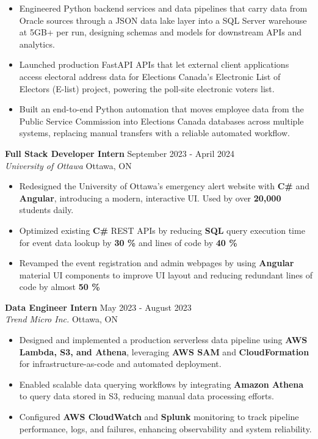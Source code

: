 \documentclass[a4paper]{article}
\begin{document}
\begin{itemize}
\item Engineered Python backend services and data pipelines that carry data from Oracle sources through a JSON data lake layer into a SQL Server warehouse at 5GB+ per run, designing schemas and models for downstream APIs and analytics.

\item Launched production FastAPI APIs that let external client applications access electoral address data for Elections Canada's Electronic List of Electors (E-list) project, powering the poll-site electronic voters list.

\item Built an end-to-end Python automation that moves employee data from the Public Service Commission into Elections Canada databases across multiple systems, replacing manual transfers with a reliable automated workflow.

\end{itemize}

\textbf{Full Stack Developer Intern } \hfill September 2023 - April 2024\\
\textit{University of Ottawa} \hfill Ottawa, ON\\
\vspace{-2mm}
\begin{itemize} \itemsep -4pt
    \item Redesigned the University of Ottawa's emergency alert website with \textbf{C\#} and \textbf{Angular}, introducing a modern, interactive UI. Used by over \textbf{20,000} students daily.
     \item Optimized existing \textbf{C\#} REST APIs by reducing \textbf{SQL} query execution time for event data lookup by \textbf{30 \%} and lines of code by \textbf{40 \%}
    \item Revamped the event registration and admin webpages by using \textbf{Angular} material UI components to improve UI layout and reducing redundant lines of code by almost \textbf{50 \%}
\end{itemize}

\textbf{Data Engineer Intern} \hfill May 2023 - August 2023\\
\textit{Trend Micro Inc.} \hfill Ottawa, ON\\
\vspace{-2mm}
\begin{itemize} \itemsep -4pt

\item Designed and implemented a production serverless data pipeline using \textbf{AWS Lambda, S3, and Athena}, leveraging \textbf{AWS SAM} and \textbf{CloudFormation} for infrastructure-as-code and automated deployment.

\item Enabled scalable data querying workflows by integrating \textbf{Amazon Athena} to query data stored in S3, reducing manual data processing efforts.

\item Configured \textbf{AWS CloudWatch} and \textbf{Splunk} monitoring to track pipeline performance, logs, and failures, enhancing observability and system reliability.

\end{itemize}
\end{document}
